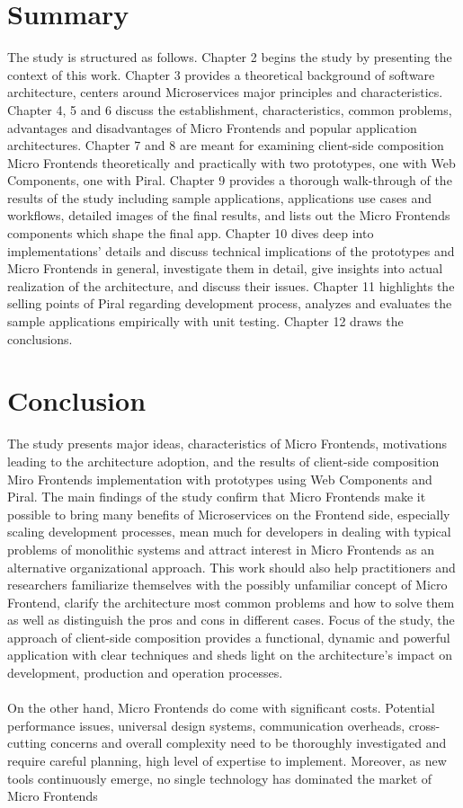 \documentclass[a4paper]{book}
\begin{document}
\section{Summary}
The study is structured as follows. Chapter 2 begins the study by presenting the context of this work. Chapter 3 provides a theoretical background of software architecture, centers around Microservices major principles and characteristics. Chapter 4, 5 and 6 discuss the establishment, characteristics, common problems, advantages and disadvantages of Micro Frontends and popular application architectures. Chapter 7 and 8 are meant for examining client-side composition Micro Frontends theoretically and practically with two prototypes, one with Web Components, one with Piral. Chapter 9 provides a thorough walk-through of the results of the study including sample applications, applications use cases and workflows, detailed images of the final results, and lists out the Micro Frontends components which shape the final app. Chapter 10 dives deep into implementations' details and discuss technical implications of the prototypes and Micro Frontends in general, investigate them in detail, give insights into actual realization of the architecture, and discuss their issues. Chapter 11 highlights the selling points of Piral regarding development process, analyzes and evaluates the sample applications empirically with unit testing. Chapter 12 draws the conclusions.
\section{Conclusion}
The study presents major ideas, characteristics of Micro Frontends, motivations leading to the architecture adoption, and the results of client-side composition Miro Frontends implementation with prototypes using Web Components and Piral. The main findings of the study confirm that Micro Frontends make it possible to bring many benefits of Microservices on the Frontend side, especially scaling development processes, mean much for developers in dealing with typical problems of monolithic systems and attract interest in Micro Frontends as an alternative organizational approach. This work should also help practitioners and researchers familiarize themselves with the possibly unfamiliar concept of Micro Frontend, clarify the architecture most common problems and how to solve them as well as distinguish the pros and cons in different cases. Focus of the study, the approach of client-side composition provides a functional, dynamic and powerful application with clear techniques and sheds light on the architecture's impact on development, production and operation processes.
\\ \\
On the other hand, Micro Frontends do come with significant costs. Potential performance issues, universal design systems, communication overheads, cross-cutting concerns and overall complexity need to be thoroughly investigated and require careful planning, high level of expertise to implement. Moreover, as new tools continuously emerge, no single technology has dominated the market of Micro Frontends
\end{document}
